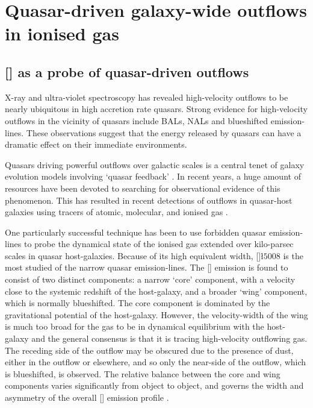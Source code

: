 
\chapter{Quasar-driven galaxy-wide outflows in ionised gas}

\label{ch:nlr}

\section{[] as a probe of quasar-driven outflows}

X-ray and ultra-violet spectroscopy has revealed high-velocity outflows to be nearly ubiquitous in high accretion rate quasars.
Strong evidence for high-velocity outflows in the vicinity of quasars include BALs, NALs and blueshifted emission-lines.
These observations suggest that the energy released by quasars can have a dramatic effect on their immediate environments.

Quasars driving powerful outflows over galactic scales is a central tenet of galaxy evolution models involving `quasar feedback' \citep[e.g.][]{silk98,springel05,bower06}.
In recent years, a huge amount of resources have been devoted to searching for observational evidence of this phenomenon.
This has resulted in recent detections of outflows in quasar-host galaxies using tracers of atomic, molecular, and ionised gas \citep[e.g.][]{nesvadba06,arav08,nesvadba08,moe09,alexander10,dunn10,feruglio10,nesvadba10,alatalo11,cano-diaz12,harrison12,harrison14,cimatti13,rupke13,veilleux13,cicone14,nardini15}.

One particularly successful technique has been to use forbidden quasar emission-lines to probe the dynamical state of the ionised gas extended over kilo-parsec scales in quasar host-galaxies.
Because of its high equivalent width, []\l$5008$ is the most studied of the narrow quasar emission-lines.
The [] emission is found to consist of two distinct components: a narrow `core' component, with a velocity close to the systemic redshift of the host-galaxy, and a broader `wing' component, which is normally blueshifted.
The core component is dominated by the gravitational potential of the host-galaxy.
However, the velocity-width of the wing is much too broad for the gas to be in dynamical equilibrium with the host-galaxy \citep[e.g.][]{liu13} and the general consensus is that it is tracing high-velocity outflowing gas. The receding side of the outflow may be obscured due to the presence of dust, either in the outflow or elsewhere, and so only the near-side of the outflow, which is blueshifted, is observed.
The relative balance between the core and wing components varies significantly from object to object, and governs the width and asymmetry of the overall [] emission profile \citep[e.g.][]{shen14}.

